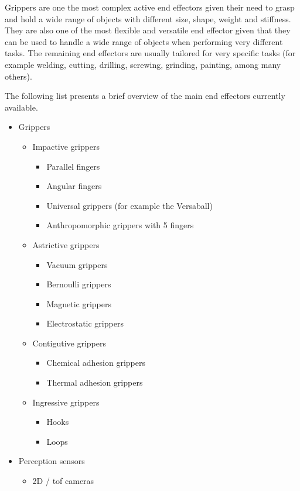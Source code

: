 Grippers are one the most complex active end effectors given their need to grasp and hold a wide range of objects with different size, shape, weight and stiffness. They are also one of the most flexible and versatile end effector given that they can be used to handle a wide range of objects when performing very different tasks. The remaining end effectors are usually tailored for very specific tasks (for example welding, cutting, drilling, screwing, grinding, painting, among many others).

The following list presents a brief overview of the main end effectors currently available.

\begin{itemize}
	\item Grippers
	\begin{itemize}
		\item Impactive grippers
		\begin{itemize}
			\item Parallel fingers
			\item Angular fingers
			\item Universal grippers (for example the Versaball)
			\item Anthropomorphic grippers with 5 fingers
		\end{itemize}
		\item Astrictive grippers
		\begin{itemize}
			\item Vacuum grippers
			\item Bernoulli grippers
			\item Magnetic grippers
			\item Electrostatic grippers
		\end{itemize}
		\item Contigutive grippers
		\begin{itemize}
			\item Chemical adhesion grippers
			\item Thermal adhesion grippers
		\end{itemize}
		\item Ingressive grippers
		\begin{itemize}
			\item Hooks
			\item Loops
		\end{itemize}
	\end{itemize}
	\item Perception sensors
	\begin{itemize}
		\item 2D / \gls{tof} cameras

\end{itemize}
\end{itemize}

